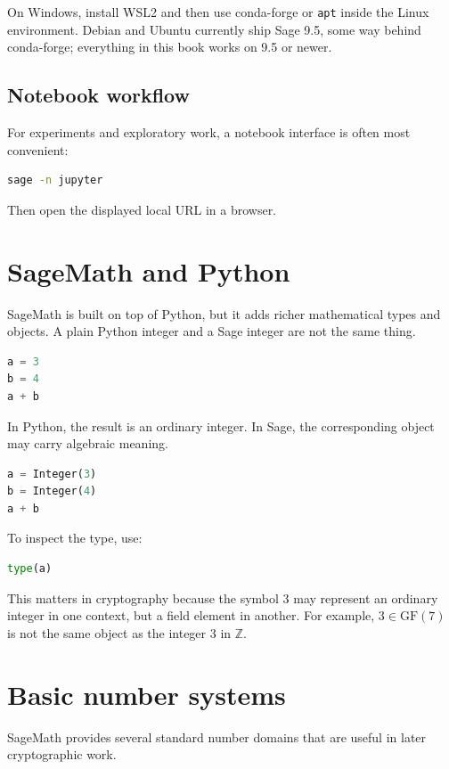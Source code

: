 On Windows, install WSL2 and then use conda-forge or \texttt{apt} inside the
Linux environment. Debian and Ubuntu currently ship Sage 9.5, some way behind
conda-forge; everything in this book works on 9.5 or newer.

\subsection{Notebook workflow}
For experiments and exploratory work, a notebook interface is often most convenient:

\begin{lstlisting}[language=bash]
sage -n jupyter
\end{lstlisting}

Then open the displayed local URL in a browser.

\section{SageMath and Python}
SageMath is built on top of Python, but it adds richer mathematical types and objects. A plain Python integer and a Sage integer are not the same thing.

\begin{lstlisting}[language=Python]
a = 3
b = 4
a + b
\end{lstlisting}

In Python, the result is an ordinary integer. In Sage, the corresponding object may carry algebraic meaning.

\begin{lstlisting}[language=Python]
a = Integer(3)
b = Integer(4)
a + b
\end{lstlisting}

To inspect the type, use:

\begin{lstlisting}[language=Python]
type(a)
\end{lstlisting}

This matters in cryptography because the symbol $3$ may represent an ordinary integer in one context, but a field element in another. For example, $3 \in \mathrm{GF}(7)$ is not the same object as the integer $3$ in $\mathbb{Z}$.

\section{Basic number systems}
SageMath provides several standard number domains that are useful in later cryptographic work.

